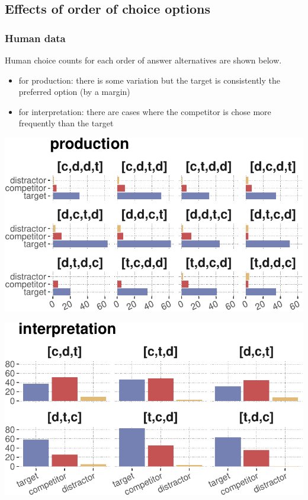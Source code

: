 \documentclass{article}
\begin{document}
\hypertarget{effects-of-order-of-choice-options}{%
\subsection{Effects of order of choice
options}\label{effects-of-order-of-choice-options}}

\hypertarget{human-data-1}{%
\subsubsection{Human data}\label{human-data-1}}

Human choice counts for each order of answer alternatives are shown
below.

\begin{itemize}
\item
  for production: there is some variation but the target is consistently
  the preferred option (by a margin)
\item
  for interpretation: there are cases where the competitor is chose more
  frequently than the target
\end{itemize}

\includegraphics{00-pics/human-data-counts-per-choiceOrder-1.pdf}

\includegraphics{00-pics/human-data-counts-per-choiceOrder-2.pdf}
\end{document}
